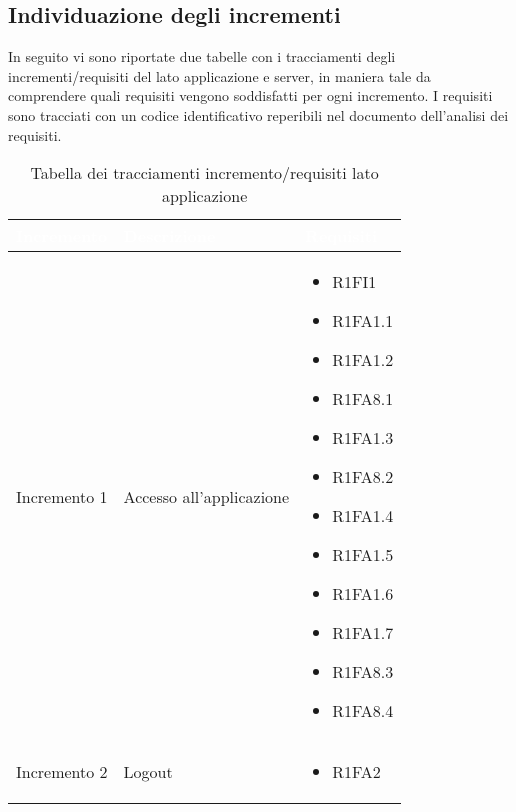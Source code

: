 \subsection{Individuazione degli incrementi}
In seguito vi sono riportate due tabelle con i tracciamenti degli incrementi/requisiti del lato applicazione e server, in maniera tale da comprendere quali requisiti vengono soddisfatti per ogni incremento.
I requisiti sono tracciati con un codice identificativo reperibili nel documento dell'analisi dei requisiti.

{
\renewcommand{\arraystretch}{2}
\centering
	
\begin{longtable}{C{4cm} C{6cm} C{4cm}}
\caption{Tabella dei tracciamenti incremento/requisiti lato applicazione}\\

\textcolor{white}{\textbf{Incremento}} &
\textcolor{white}{\textbf{Descrizione}} & 
\textcolor{white}{\textbf{Requisiti}}\\
\endfirsthead
\endhead

Incremento 1 & Accesso all'applicazione & \begin{itemize}
    \item[ ] R1FI1
    \item[ ] R1FA1.1
    \item[ ] R1FA1.2
    \item[ ] R1FA8.1
    \item[ ] R1FA1.3
    \item[ ] R1FA8.2
    \item[ ] R1FA1.4
    \item[ ] R1FA1.5
    \item[ ] R1FA1.6
    \item[ ] R1FA1.7
    \item[ ] R1FA8.3
    \item[ ] R1FA8.4
\end{itemize}  \\

Incremento 2 & Logout & \begin{itemize}
    \item[ ] R1FA2
\end{itemize} \\


\end{longtable}}
